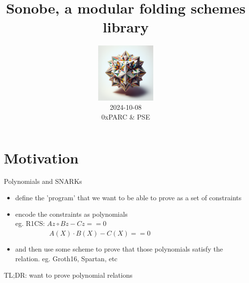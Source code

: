 \documentclass[t]{beamer} \usefonttheme[onlymath]{serif}
\title{Sonobe, a modular folding schemes library}
\date{
  \includegraphics[width=3cm]{sonobe}\\
  \vspace{0.1cm}
  \scriptsize{2024-10-08\\0xPARC \& PSE}
}
\begin{document}
\frame{\titlepage}

%

\section{Motivation}

\begin{frame}{Polynomials and SNARKs}
  \begin{itemize}
    \item define the 'program' that we want to be able to prove as a set of constraints
    \item encode the constraints as polynomials
    \\eg. R1CS: $Az \circ Bz - Cz == 0$
    \\~~~~~~~~~~$A(X) \cdot B(X) - C(X) == 0$
    \item and then use some scheme to prove that those polynomials satisfy the relation. eg. Groth16, Spartan, etc
  \end{itemize}
  \vspace{0.5cm}
  TL;DR: want to prove polynomial relations
\end{frame}
\end{document}
